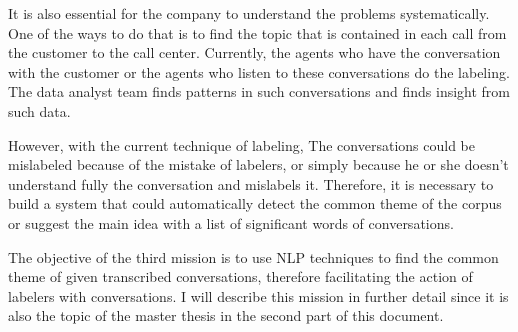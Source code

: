 It is also essential for the company to understand the problems systematically. One of the ways to do that is to find the topic that is contained in each call from the customer to the call center. Currently, the agents who have the conversation with the customer or the agents who listen to these conversations do the labeling. The data analyst team finds patterns in such conversations and finds insight from such data. 

However, with the current technique of labeling, The conversations could be mislabeled because of the mistake of labelers, or simply because he or she doesn't understand fully the conversation and mislabels it. Therefore, it is necessary to build a system that could automatically detect the common theme of the corpus or suggest the main idea with a list of significant words of conversations.

The objective of the third mission is to use NLP techniques to find the common theme of given transcribed conversations, therefore facilitating the action of labelers with conversations. I will describe this mission in further detail since it is also the topic of the master thesis in the second part of this document.